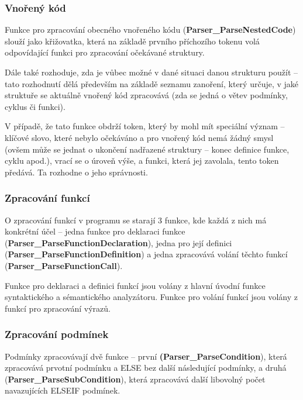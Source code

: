 \documentclass[a4paper,11pt]{article}
\begin{document}
\subsubsection{Vnořený kód} \label{syse-reseni-vnoreny_kod}
Funkce pro zpracování obecného vnořeného kódu (\textbf{Parser\_ParseNestedCode}) slouží jako křižovatka, která na základě prvního příchozího tokenu volá odpovídající funkci pro zpracování očekávané struktury.

\vspace{2mm}
Dále také rozhoduje, zda je vůbec možné v dané situaci danou strukturu použít – tato rozhodnutí dělá především na základě seznamu zanoření, který určuje, v jaké struktuře se aktuálně vnořený kód zpracovává (zda se jedná o větev podmínky, cyklus či funkci).

\vspace{2mm}
V případě, že tato funkce obdrží token, který by mohl mít speciální význam – klíčové slovo, které nebylo očekáváno a pro vnořený kód nemá žádný smysl (ovšem může se jednat o ukončení nadřazené struktury – konec definice funkce, cyklu apod.), vrací se o úroveň výše, a funkci, která jej zavolala, tento token předává. Ta rozhodne o jeho správnosti.

\subsubsection{Zpracování funkcí} \label{syse-reseni-funkce}
O zpracování funkcí v programu se starají 3 funkce, kde každá z nich má konkrétní účel – jedna funkce pro deklaraci funkce (\textbf{Parser\_ParseFunctionDeclaration}), jedna pro její definici (\textbf{Parser\_ParseFunctionDefinition}) a jedna zpracovává volání těchto funkcí (\textbf{Parser\_ParseFunctionCall}).

\vspace{2mm}
Funkce pro deklaraci a definici funkcí jsou volány z hlavní úvodní funkce syntaktického a sémantického analyzátoru. Funkce pro volání funkcí jsou volány z funkcí pro zpracování výrazů.

\subsubsection{Zpracování podmínek} \label{syse-reseni-podminky}
Podmínky zpracovávají dvě funkce – první \textbf{(Parser\_ParseCondition}), která zpracovává prvotní podmínku a \textsf{ELSE} bez další následující podmínky, a druhá (\textbf{Parser\_ParseSubCondition}), která zpracovává další libovolný počet navazujících \textsf{ELSEIF} podmínek.
\end{document}
